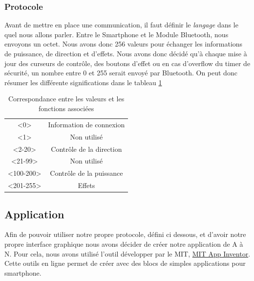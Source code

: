 \documentclass[a4paper,12pt]{book}
\begin{document}
				\subsubsection{Protocole}
				Avant de mettre en place une communication, il faut définir le \textit{langage} dans le quel nous allons parler. Entre le Smartphone et le Module Bluetooth, nous envoyons un octet. Nous avons donc 256 valeurs pour échanger les informations de puissance, de direction et d'effets. Nous avons donc décidé qu'à chaque mise à jour des curseurs de contrôle, des boutons d'effet ou en cas d'overflow du timer de sécurité, un nombre entre 0 et 255 serait envoyé par Bluetooth. On peut donc résumer les différente significations dans le tableau \ref{protocol}
\begin{table}[h]
	\begin{center}
	
	\begin{tabular}{cc}
		<0>       & Information de connexion \\
		<1>    	  & Non utilisé               \\
		<2-20>    & Contrôle de la direction  \\
		<21-99>   & Non utilisé               \\
		<100-200> & Contrôle de la puissance  \\
		<201-255> & Effets                   
	\end{tabular}
		\end{center}
	\caption{Correspondance entre les valeurs et les fonctions associées}
	\label{protocol}
\end{table}

			\subsection{Application}
			Afin de pouvoir utiliser notre propre protocole, défini ci dessous, et d'avoir notre propre interface graphique nous avons décider de créer notre application de A à N. Pour cela, nous avons utilisé l'outil développer par le MIT, \href{http://ai2.appinventor.mit.edu/}{MIT App Inventor}. Cette outils en ligne permet de créer avec des blocs de simples applications pour smartphone.
\end{document}
